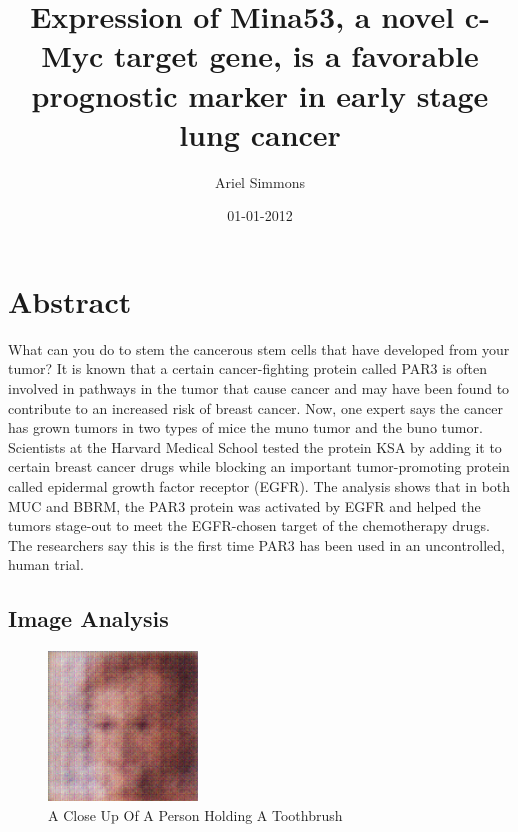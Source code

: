 \documentclass{article}%
\title{Expression of Mina53, a novel c{-}Myc target gene, is a favorable prognostic marker in early stage lung cancer}%
\author{Ariel Simmons}%
\affil{CAS Key Laboratory of Pathogenic Microbiology and Immunology, Institute of Microbiology, Chinese Academy of Sciences, Beijing, China}%
\date{01{-}01{-}2012}%
\begin{document}
%
\normalsize%
\maketitle%
\section{Abstract}%
\label{sec:Abstract}%
What can you do to stem the cancerous stem cells that have developed from your tumor?\newline%
It is known that a certain cancer{-}fighting protein called PAR3 is often involved in pathways in the tumor that cause cancer and may have been found to contribute to an increased risk of breast cancer. Now, one expert says the cancer has grown tumors in two types of mice  the muno tumor and the buno tumor.\newline%
Scientists at the Harvard Medical School tested the protein KSA by adding it to certain breast cancer drugs while blocking an important tumor{-}promoting protein called epidermal growth factor receptor (EGFR). The analysis shows that in both MUC and BBRM, the PAR3 protein was activated by EGFR and helped the tumors stage{-}out to meet the EGFR{-}chosen target of the chemotherapy drugs.\newline%
The researchers say this is the first time PAR3 has been used in an uncontrolled, human trial.

%
\subsection{Image Analysis}%
\label{subsec:ImageAnalysis}%


\begin{figure}[h!]%
\centering%
\includegraphics[width=150px]{500_fake_images/samples_5_282.png}%
\caption{A Close Up Of A Person Holding A Toothbrush}%
\end{figure}

%
\end{document}
